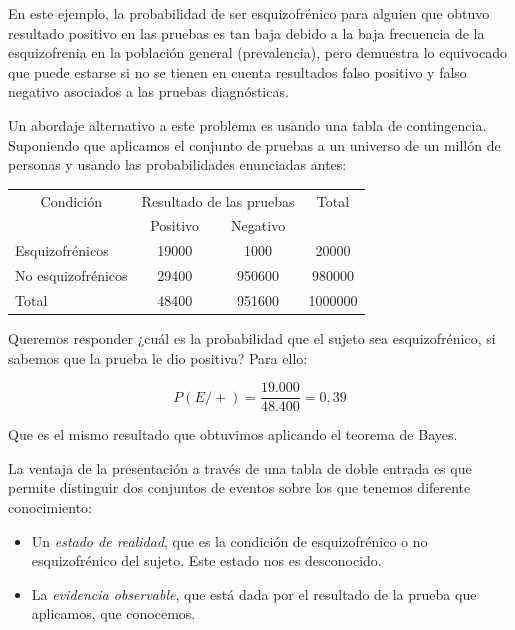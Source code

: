 \documentclass[]{article}
\begin{document}
En este ejemplo, la probabilidad de ser esquizofrénico para alguien que
obtuvo resultado positivo en las pruebas es tan baja debido a la baja
frecuencia de la esquizofrenia en la población general (prevalencia),
pero demuestra lo equivocado que puede estarse si no se tienen en cuenta
resultados falso positivo y falso negativo asociados a las pruebas
diagnósticas.

Un abordaje alternativo a este problema es usando una tabla de
contingencia. Suponiendo que aplicamos el conjunto de pruebas a un
universo de un millón de personas y usando las probabilidades enunciadas
antes:

\begin{table}[H]
\centering
\begin{tabular}{lccc}
\toprule
\multicolumn{1}{c}{Condición} & \multicolumn{2}{c}{Resultado de las pruebas} & \multicolumn{1}{c}{Total} \\
\cmidrule(l{3pt}r{3pt}){1-1} \cmidrule(l{3pt}r{3pt}){2-3} \cmidrule(l{3pt}r{3pt}){4-4}
 & Positivo & Negativo & \\
\midrule
\rowcolor{gray!6}  Esquizofrénicos & 19000 & 1000 & 20000\\
No esquizofrénicos & 29400 & 950600 & 980000\\
\rowcolor{gray!6}  Total & 48400 & 951600 & 1000000\\
\bottomrule
\end{tabular}
\end{table}

Queremos responder ¿cuál es la probabilidad que el sujeto sea
esquizofrénico, si sabemos que la prueba le dio positiva? Para ello:

\[P(E/+) = \frac{19.000}{48.400} = 0,39\]

Que es el mismo resultado que obtuvimos aplicando el teorema de Bayes.

La ventaja de la presentación a través de una tabla de doble entrada es
que permite distinguir dos conjuntos de eventos sobre los que tenemos
diferente conocimiento:

\begin{itemize}
\item
  Un \emph{estado de realidad}, que es la condición de esquizofrénico o
  no esquizofrénico del sujeto. Este estado nos es desconocido.
\item
  La \emph{evidencia observable}, que está dada por el resultado de la
  prueba que aplicamos, que conocemos.
\end{itemize}
\end{document}
